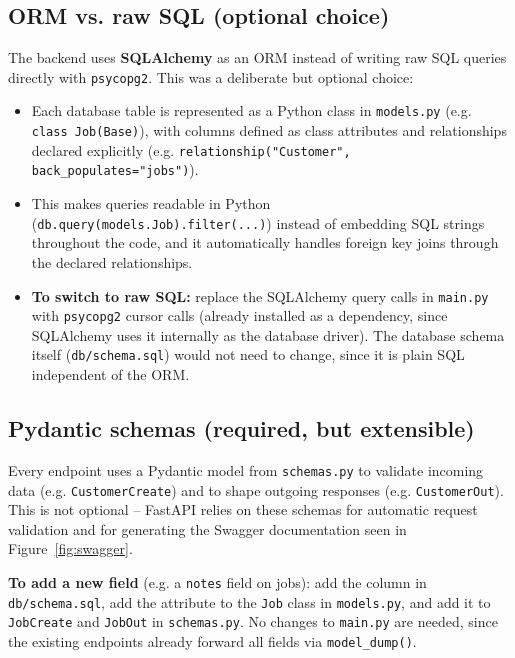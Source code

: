 \documentclass[11pt,a4paper]{article}
\begin{document}
\subsection{ORM vs. raw SQL (optional choice)}

The backend uses \textbf{SQLAlchemy} as an ORM instead of writing raw SQL queries directly with \texttt{psycopg2}. This was a deliberate but optional choice:

\begin{itemize}
  \item Each database table is represented as a Python class in \texttt{models.py} (e.g. \texttt{class Job(Base)}), with columns defined as class attributes and relationships declared explicitly (e.g. \texttt{relationship("Customer", back\_populates="jobs")}).
  \item This makes queries readable in Python (\texttt{db.query(models.Job).filter(...)}) instead of embedding SQL strings throughout the code, and it automatically handles foreign key joins through the declared relationships.
  \item \textbf{To switch to raw SQL:} replace the SQLAlchemy query calls in \texttt{main.py} with \texttt{psycopg2} cursor calls (already installed as a dependency, since SQLAlchemy uses it internally as the database driver). The database schema itself (\texttt{db/schema.sql}) would not need to change, since it is plain SQL independent of the ORM.
\end{itemize}

\subsection{Pydantic schemas (required, but extensible)}

Every endpoint uses a Pydantic model from \texttt{schemas.py} to validate incoming data (e.g. \texttt{CustomerCreate}) and to shape outgoing responses (e.g. \texttt{CustomerOut}). This is not optional -- FastAPI relies on these schemas for automatic request validation and for generating the Swagger documentation seen in Figure~\ref{fig:swagger}.

\textbf{To add a new field} (e.g. a \texttt{notes} field on jobs): add the column in \texttt{db/schema.sql}, add the attribute to the \texttt{Job} class in \texttt{models.py}, and add it to \texttt{JobCreate} and \texttt{JobOut} in \texttt{schemas.py}. No changes to \texttt{main.py} are needed, since the existing endpoints already forward all fields via \texttt{model\_dump()}.
\end{document}
